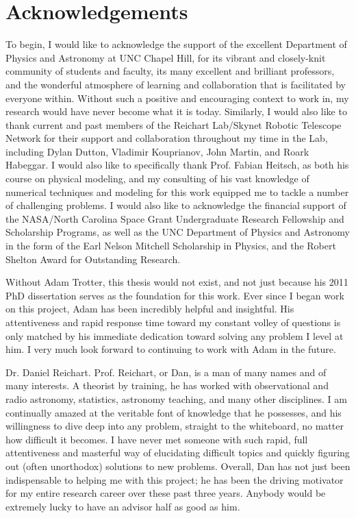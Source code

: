 \chapter*{Acknowledgements}
\label{cha:section_acknowledgements}
To begin, I would like to acknowledge the support of the excellent Department of Physics and Astronomy at UNC Chapel Hill, for its vibrant and closely-knit community of students and faculty, its many excellent and brilliant professors, and the wonderful atmosphere of learning and collaboration that is facilitated by everyone within. Without such a positive and encouraging context to work in, my research would have never become what it is today. Similarly, I would also like to thank current and past members of the Reichart Lab/Skynet Robotic Telescope Network for their support and collaboration throughout my time in the Lab, including Dylan Dutton, Vladimir Kouprianov, John Martin, and Roark Habeggar. I would also like to specifically thank Prof. Fabian Heitsch, as both his course on physical modeling, and my consulting of his vast knowledge of numerical techniques and modeling for this work equipped me to tackle a number of challenging problems. I would also like to acknowledge the financial support of the NASA/North Carolina Space Grant Undergraduate Research Fellowship and Scholarship Programs, as well as the UNC Department of Physics and Astronomy in the form of the Earl Nelson Mitchell Scholarship in Physics, and the Robert Shelton Award for Outstanding Research.



Without Adam Trotter, this thesis would not exist, and not just because his 2011 PhD dissertation serves as the foundation for this work. Ever since I began work on this project, Adam has been incredibly helpful and insightful. His attentiveness and rapid response time toward my constant volley of questions is only matched by his immediate dedication toward solving any problem I level at him. I very much look forward to continuing to work with Adam in the future.

Dr. Daniel Reichart. Prof. Reichart, or Dan, is a man of many names and of many interests. A theorist by training, he has worked with observational and radio astronomy, statistics, astronomy teaching, and many other disciplines. I am continually amazed at the veritable font of knowledge that he possesses, and his willingness to dive deep into any problem, straight to the whiteboard, no matter how difficult it becomes. I have never met someone with such rapid, full attentiveness and masterful way of elucidating difficult topics and quickly figuring out (often unorthodox) solutions to new problems. Overall, Dan has not just been indispensable to helping me with this project; he has been the driving motivator for my entire research career over these past three years. Anybody would be extremely lucky to have an advisor half as good as him.
